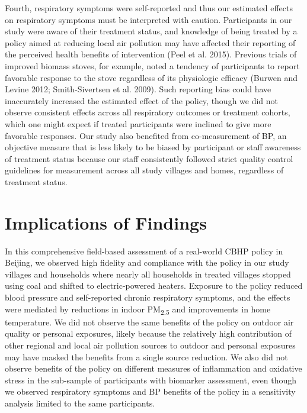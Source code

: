 \documentclass[
  letterpaper,
  DIV=11,
  numbers=noendperiod]{scrartcl}
\begin{document}
Fourth, respiratory symptoms were self-reported and thus our estimated
effects on respiratory symptoms must be interpreted with caution.
Participants in our study were aware of their treatment status, and
knowledge of being treated by a policy aimed at reducing local air
pollution may have affected their reporting of the perceived health
benefits of intervention (Peel et al. 2015). Previous trials of improved
biomass stoves, for example, noted a tendency of participants to report
favorable response to the stove regardless of its physiologic efficacy
(Burwen and Levine 2012; Smith-Sivertsen et al. 2009). Such reporting
bias could have inaccurately increased the estimated effect of the
policy, though we did not observe consistent effects across all
respiratory outcomes or treatment cohorts, which one might expect if
treated participants were inclined to give more favorable responses. Our
study also benefited from co-measurement of BP, an objective measure
that is less likely to be biased by participant or staff awareness of
treatment status because our staff consistently followed strict quality
control guidelines for measurement across all study villages and homes,
regardless of treatment status.

\section{Implications of Findings}\label{implications-of-findings}

In this comprehensive field-based assessment of a real-world CBHP policy
in Beijing, we observed high fidelity and compliance with the policy in
our study villages and households where nearly all households in treated
villages stopped using coal and shifted to electric-powered heaters.
Exposure to the policy reduced blood pressure and self-reported chronic
respiratory symptoms, and the effects were mediated by reductions in
indoor PM\textsubscript{2.5} and improvements in home temperature. We
did not observe the same benefits of the policy on outdoor air quality
or personal exposures, likely because the relatively high contribution
of other regional and local air pollution sources to outdoor and
personal exposures may have masked the benefits from a single source
reduction. We also did not observe benefits of the policy on different
measures of inflammation and oxidative stress in the sub-sample of
participants with biomarker assessment, even though we observed
respiratory symptoms and BP benefits of the policy in a sensitivity
analysis limited to the same participants.
\end{document}
